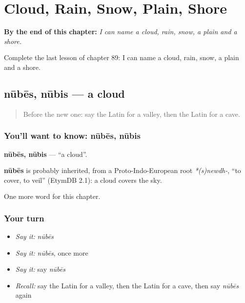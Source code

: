 
\chapter{Cloud, Rain, Snow, Plain, Shore}
\label{ch:la-cloud-rain-snow-plain-shore}

\begin{chapteropening}
\textbf{By the end of this chapter:} \emph{I can name a cloud, rain, snow, a plain and a shore.}

Complete the last lesson of chapter 89: I can name a cloud, rain, snow, a plain and a shore.
\end{chapteropening}

\section[nūbēs, nūbis]{nūbēs, nūbis — a cloud}

\label{lesson:LA-C89-nubes}



\begin{quote}
Before the new one: say the Latin for a valley, then the Latin for a cave.
\end{quote}

\subsection*{You'll want to know: nūbēs, nūbis}
\textbf{nūbēs, nūbis} — \textquotedblleft{}a cloud\textquotedblright{}.

\begin{cousinweb}
\textbf{nūbēs} is probably inherited, from a Proto-Indo-European root \emph{*(s)newdh-}, \textquotedblleft{}to cover, to veil\textquotedblright{} (EtymDB 2.1): a cloud covers the sky.
\end{cousinweb}

\begin{grammarlens}[title={What you've built}]
One more word for this chapter.
\end{grammarlens}

\subsection*{Your turn}
\begin{itemize}
\raggedright
  \item \emph{Say it:} \emph{nūbēs}
  \item \emph{Say it:} \emph{nūbēs}, once more
  \item \emph{Say it:} say \emph{nūbēs}
  \item \emph{Recall:} say the Latin for a valley, then the Latin for a cave, then say \emph{nūbēs} again
\end{itemize}

